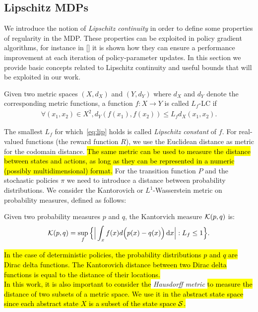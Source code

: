 \subsection{Lipschitz \ac{MDPs}}
We introduce the notion of \emph{Lipschitz continuity} in order to define some properties of regularity in the \ac{MDP}. These properties can be exploited in policy gradient algorithms, for instance in [\cite{pirotta2015policy}] it is shown how they can ensure a performance improvement at each iteration of policy-parameter updates. In this section we provide basic concepts related to Lipschitz continuity and useful bounds that will be exploited in our work.
\begin{definition}
Given two metric spaces $(X, d_X)$ and $(Y, d_Y)$ where $d_X$ and $d_Y$ denote the corresponding metric functions, a function $f: X \rightarrow Y$ is called $L_f$-\acf{LC} if
\begin{align} \forall(x_1, x_2) \in X^2, d_Y(f(x_1), f(x_2)) \leq L_f d_X(x_1, x_2). \label{eq:lip} \end{align}
\end{definition}
\noindent The smallest $L_f$ for which~\eqref{eq:lip} holds is called \emph{Lipschitz constant} of $f$. For real-valued functions (\eg the reward function $R$), we use the Euclidean distance as metric for the codomain distance. \hl{The same metric can be used to measure the distance between states and actions, as long as they can be represented in a numeric (possibly multidimensional) format.} For the transition function $P$ and the stochastic policies $\pi$ we need to introduce a distance between probability distributions. We consider the Kantorovich or $L^1$-Wasserstein metric on probability measures, defined as follows:
\begin{definition}
Given two probability measures $p$ and $q$, the Kantorvich measure $\mathcal{K}(p, q)$ is:
\begin{align} \mathcal{K}(p, q) = \sup_f\Big\{ \Big| \int_x f(x) d\Big(p(x)-q(x)\Big) \,\mathrm{d} x \Big|: L_f \leq 1 \Big\}. \label{eq:kant}\end{align}
\end{definition}
\noindent \hl{In the case of deterministic policies, the probability distributions $p$ and $q$ are Dirac delta functions. The Kantorovich distance between two Dirac delta functions is equal to the distance of their locations.}\\
\newline
\hl{In this work, it is also important to consider the} \emph{Hausdorff metric} \hl{to measure the distance of two subsets of a metric space. We use it in the abstract state space since each abstract state $X$ is a subset of the state space $\mathcal{S}$.}

